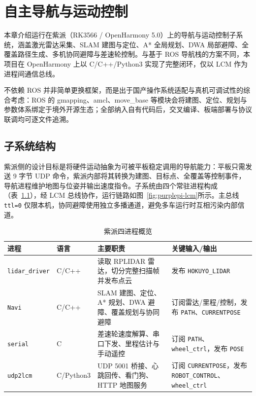 \chapter{自主导航与运动控制}
\label{ch:navigation}

本章介绍运行在紫派（RK3566 / OpenHarmony 5.0）上的导航与运动控制子系统，涵盖激光雷达采集、SLAM 建图与定位、A* 全局规划、DWA 局部避障、全覆盖路径生成、多机协同避障与差速轮控制。与基于 ROS 导航栈的方案不同，本项目在 OpenHarmony 上以 C/C++/Python3 实现了完整闭环，仅以 LCM 作为进程间通信总线。

不依赖 ROS 并非简单更换框架，而是出于国产操作系统适配与真机可调试性的综合考虑：ROS 的 gmapping、amcl、move\_base 等模块会将建图、定位、规划与参数体系绑定于境外开源生态；全部纳入自有代码后，交叉编译、板端部署与协议联调均可逐文件追溯。

\section{子系统结构}
\label{sec:nav-positioning}

紫派侧的设计目标是将硬件运动抽象为可被平板稳定调用的导航能力：平板只需发送 9 字节 UDP 命令，紫派内部将其转换为建图、目标点、全覆盖等控制事件，导航进程维护地图与位姿并输出速度指令。子系统由四个常驻进程构成（表~\ref{tab:purplepi-processes}），经 LCM 总线协作，运行链路如图~\ref{fig:purplepi-lcm}所示。主总线 \texttt{ttl=0} 仅限本机，协同避障使用独立多播通道，避免多车运行时互相污染内部信道。

\begin{table}[htbp]
\centering
\caption{紫派四进程概览}
\label{tab:purplepi-processes}
\begin{tabularx}{\textwidth}{p{2.5cm}p{1.5cm}Xp{3.5cm}}
\toprule
\textbf{进程} & \textbf{语言} & \textbf{主要职责} & \textbf{关键输入/输出} \\
\midrule
\texttt{lidar\_driver} & C/C++ & 读取 RPLIDAR 雷达，切分完整扫描帧并发布点云 & 发布 \texttt{HOKUYO\_LIDAR} \\
\texttt{Navi} & C/C++ & SLAM 建图、定位、A* 规划、DWA 避障、覆盖规划与协同避障 & 订阅雷达/里程/控制，发布 \texttt{PATH}、\texttt{CURRENTPOSE} \\
\texttt{serial} & C & 差速轮速度解算、串口下发、里程估计与手动遥控 & 订阅 \texttt{PATH}、\texttt{wheel\_ctrl}，发布 \texttt{POSE} \\
\texttt{udp2lcm} & C/Python3 & UDP 5001 桥接、心跳回传、看门狗、HTTP 地图服务 & 订阅 \texttt{CURRENTPOSE}，发布 \texttt{ROBOT\_CONTROL}、\texttt{wheel\_ctrl} \\
\bottomrule
\end{tabularx}
\end{table}

